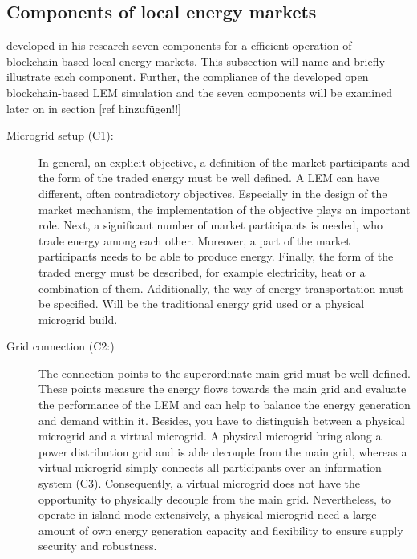 \subsection{Components of local energy markets}
\label{sec:components_of_local_energy_markets}
 developed in his research seven components for a efficient
operation of blockchain-based local energy markets. This subsection will name and briefly 
illustrate each component. Further, the compliance of the developed open blockchain-based
LEM simulation and the seven components will be examined later on in section [ref hinzufügen!!]

\begin{description}
    \item[Microgrid setup (C1):] In general, an explicit objective, a definition of the market 
     participants and the form of the traded energy must be well defined. 
     A LEM can have different, often contradictory objectives. Especially in the
     design of the market mechanism, the implementation of the objective plays an important role.
     Next, a significant number of market participants is needed, who trade energy among each other.
     Moreover, a part of the market participants needs to be able to produce energy. 
     Finally, the form of the traded energy must be described, for example electricity, heat or a 
     combination of them. Additionally, the way of energy transportation must be specified.
     Will be the traditional energy grid used or a physical microgrid build. 
    
    \item[Grid connection (C2:)] The connection points to the superordinate main grid 
     must be well defined. These points measure the energy flows towards the main grid 
     and evaluate the performance of the LEM and can help to balance the energy generation 
     and demand within it. Besides, you have to distinguish between a physical microgrid and 
     a virtual microgrid. A physical microgrid bring along a power distribution grid and is able
     decouple from the main grid, whereas a virtual microgrid simply connects all participants over 
     an information system (C3). Consequently, a virtual microgrid does not have the opportunity
     to physically decouple from the main grid. 
     Nevertheless, to operate in island-mode extensively, a physical microgrid need a large 
     amount of own energy generation capacity and flexibility to ensure supply security and robustness.
         

\end{description}
